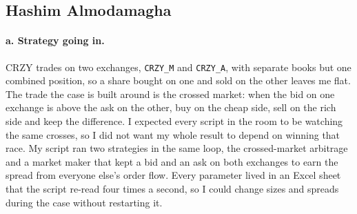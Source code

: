 %
%     
%
%
%
%

\subsection{Hashim Almodamagha}

\paragraph{a. Strategy going in.}
CRZY trades on two exchanges, \texttt{CRZY\_M} and \texttt{CRZY\_A}, with separate
books but one combined position, so a share bought on one and sold on the other
leaves me flat. The trade the case is built around is the crossed market: when the
bid on one exchange is above the ask on the other, buy on the cheap side, sell on the
rich side and keep the difference. I expected every script in the room to be
watching the same crosses, so I did not want my whole result to depend on winning
that race. My script ran two strategies in the same loop, the crossed-market
arbitrage and a market maker that kept a bid and an ask on both exchanges to earn the
spread from everyone else's order flow. Every parameter lived in an Excel sheet that
the script re-read four times a second, so I could change sizes and spreads during
the case without restarting it.

